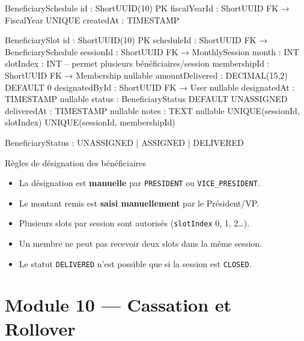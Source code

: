 \documentclass[12pt, a4paper]{report}
\begin{document}
\begin{codeBox}
BeneficiarySchedule {
  id            : ShortUUID(10)  PK
  fiscalYearId  : ShortUUID      FK → FiscalYear  UNIQUE
  createdAt     : TIMESTAMP
}

BeneficiarySlot {
  id               : ShortUUID(10)       PK
  scheduleId       : ShortUUID           FK → BeneficiarySchedule
  sessionId        : ShortUUID           FK → MonthlySession
  month            : INT
  slotIndex        : INT                 -- permet plusieurs bénéficiaires/session
  membershipId     : ShortUUID FK → Membership  nullable
  amountDelivered  : DECIMAL(15,2)       DEFAULT 0
  designatedById   : ShortUUID FK → User nullable
  designatedAt     : TIMESTAMP           nullable
  status           : BeneficiaryStatus   DEFAULT UNASSIGNED
  deliveredAt      : TIMESTAMP           nullable
  notes            : TEXT                nullable
  UNIQUE(sessionId, slotIndex)
  UNIQUE(sessionId, membershipId)
}

BeneficiaryStatus : UNASSIGNED | ASSIGNED | DELIVERED
\end{codeBox}

\begin{ruleBox}{Règles de désignation des bénéficiaires}
\begin{itemize}
  \item La désignation est \textbf{manuelle} par \texttt{PRESIDENT} ou \texttt{VICE\_PRESIDENT}.
  \item Le montant remis est \textbf{saisi manuellement} par le Président/VP.
  \item Plusieurs slots par session sont autorisés (\texttt{slotIndex} 0, 1, 2\ldots).
  \item Un membre ne peut pas recevoir deux slots dans la même session.
  \item Le statut \texttt{DELIVERED} n'est possible que si la session est \texttt{CLOSED}.
\end{itemize}
\end{ruleBox}

\section{Module 10 — Cassation et Rollover}
\end{document}
